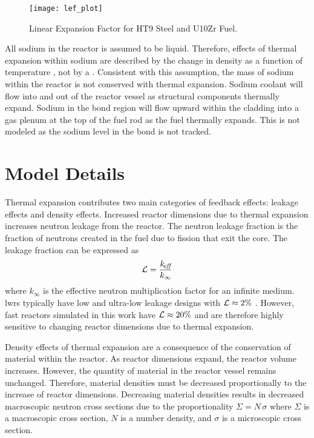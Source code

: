   \begin{figure}
    \centering
    \texttt{[image: lef\_plot]}
    \caption{Linear Expansion Factor for HT9 Steel and U10Zr Fuel.}
    \label{fig:lef_plot}
  \end{figure}

  All sodium in the reactor is assumed to be liquid. Therefore, effects of
  thermal expansion within sodium are described by the change in density as a
  function of temperature \cite{sodiumProp}, not by a . 
  Consistent with this assumption, the mass of sodium within the reactor is not
  conserved with thermal expansion. Sodium coolant will flow into and out of the
  reactor vessel as structural components thermally expand. Sodium in the bond
  region will flow upward within the cladding into a gas plenum at the top of
  the fuel rod as the fuel thermally expands. This is not modeled as the sodium
  level in the bond is not tracked.
    
\section{Model Details}
  \label{sec:model_details}
  Thermal expansion contributes two main categories of feedback effects: leakage
  effects and density effects. Increased reactor dimensions due to thermal
  expansion increases neutron leakage from the reactor. The neutron leakage
  fraction is the fraction of neutrons created in the fuel due to fission that
  exit the core. The leakage fraction can be expressed as
  \begin{equation}
    \label{eq:leakage}
    \mathcal{L} = \frac{k_{\!\mbox{\scriptsize \em eff}}}{k_{\infty}}
  \end{equation}
  where $k_{\infty}$ is the effective neutron multiplication factor for an
  infinite medium. \glspl{lwr} typically have low and ultra-low leakage
  designs with $\mathcal{L} \approx 2 \%$ \cite{textbookknief}. However, fast
  reactors simulated in this work have $\mathcal{L} \approx 20\%$ and are
  therefore highly sensitive to changing reactor dimensions due to thermal 
  expansion.

  Density effects of thermal expansion are a consequence of the conservation of
  material within the reactor. As reactor dimensions expand, the reactor volume
  increases. However, the quantity of material in the reactor vessel remains 
  unchanged. Therefore, material densities must be decreased proportionally to
  the increase of reactor dimensions. Decreasing material densities results in
  decreased macroscopic neutron cross sections due to the proportionality
  $\Sigma = N \, \sigma$ where $\Sigma$ is a macroscopic cross section, $N$ is a
  number density, and $\sigma$ is a microscopic cross section.

